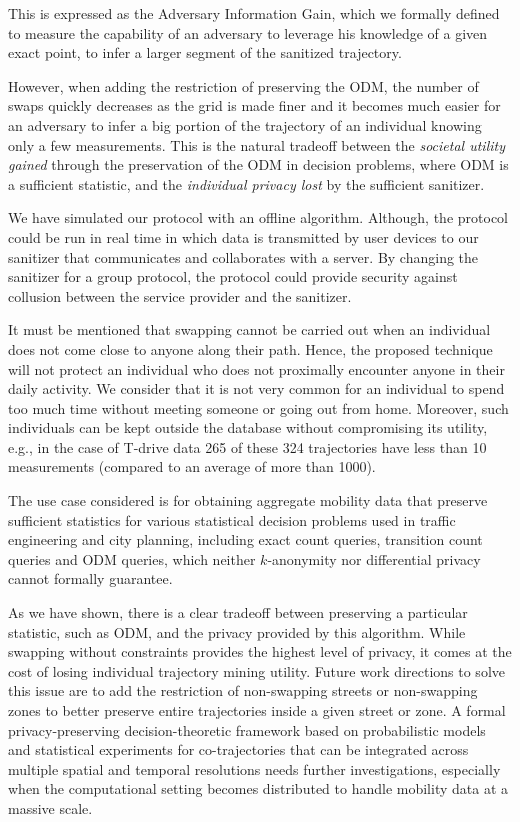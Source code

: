 \documentclass[review]{elsarticle}
\begin{document}
This is expressed as the Adversary Information Gain, which we formally defined to measure the capability of an adversary to leverage his knowledge of a given exact point, to infer a larger segment of the sanitized trajectory.

However, when adding
the restriction of preserving the ODM, the number of swaps quickly
decreases as the grid is made finer and it becomes much easier for an
adversary to infer a big portion of the trajectory of an individual
knowing only a few measurements.  
This is the natural tradeoff between the {\em societal utility gained} through the preservation of the ODM in decision problems, where ODM is a sufficient statistic, and the {\em individual privacy lost} by the sufficient sanitizer.

We have simulated our protocol with an offline algorithm. Although, the protocol could be run in real time in which data is transmitted by user devices to our sanitizer that communicates and collaborates with a server. By changing the sanitizer for a group protocol, the protocol could provide security against collusion between the service provider and the sanitizer.


It must be mentioned that swapping cannot be carried out when an individual does not come close to anyone along their path. 
Hence, the proposed technique will not protect an individual who does not proximally encounter anyone in their daily activity.  
We consider that it is not very common for an individual to spend too much time without meeting someone or going out from home. Moreover, such individuals can be kept outside the database without compromising its utility, e.g., in the case of T-drive data 265 of these 324 trajectories have less than 10 measurements (compared to an average of more than 1000).


The use case considered is for obtaining aggregate mobility data that preserve sufficient statistics for various statistical decision problems used in traffic engineering and city planning, including exact count queries, transition count queries and ODM queries, which neither $k$-anonymity nor differential privacy cannot formally guarantee.

As we have shown, there is a clear tradeoff between preserving a particular statistic, such as ODM, and the privacy provided by this algorithm.
While swapping without constraints provides the highest level of privacy, it comes at the cost of losing individual trajectory mining utility.
Future work directions to solve this issue are to add the restriction of non-swapping streets or non-swapping zones to better preserve entire trajectories inside a given street or zone.  
A formal privacy-preserving decision-theoretic framework based on probabilistic models and statistical experiments for co-trajectories that can be integrated across multiple spatial and temporal resolutions needs further investigations, especially when the computational setting becomes distributed to handle mobility data at a massive scale.



     

\end{document}
